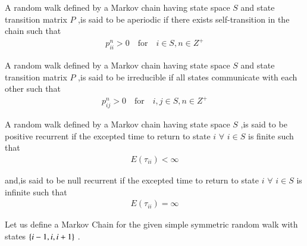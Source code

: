 

\begin{definition}[Aperiodicity]
A random walk defined by a Markov chain having state space $S$ and state transition matrix $P$ ,is said to be aperiodic if there exists self-transition in the chain such that
\begin{align}
    p^n_{ii}>0 \quad \text{for} \quad i \in S,n \in Z^+
\end{align}
\end{definition}

\begin{definition}[Irreducibility]
A random walk defined by a Markov chain having state space $S$ and state transition matrix $P$ ,is said to be irreducible if all states communicate with each other such that
\begin{align}
    p^n_{ij}>0 \quad \text{for} \quad i,j \in S,n \in Z^+
\end{align}
\end{definition}

\begin{definition}
A random walk defined by a Markov chain having state space $S$ ,is said to be positive recurrent if the excepted time to return to state $i$ $\forall$ $i \in S$ is finite such that
\begin{align}
    E(\tau_{ii}) < \infty
\end{align}

and,is said to be null recurrent if the excepted time to return to state $i$ $\forall$ $i \in S$ is infinite such that
\begin{align}
    E(\tau_{ii}) = \infty
\end{align}
\end{definition}

Let us define a Markov Chain for the given simple symmetric random walk with states $\left\{i-1,i,i+1\right\}$ .

